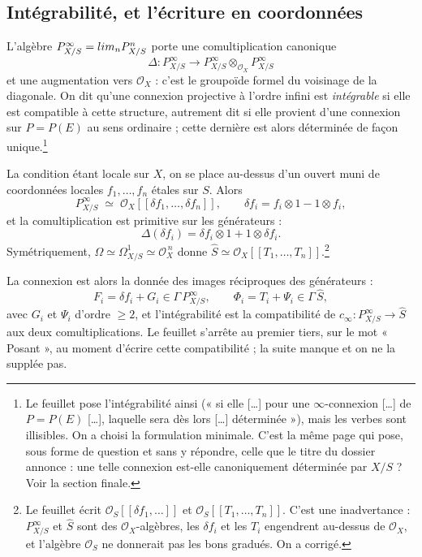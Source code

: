 \documentclass[11pt,a4paper]{article}
\begin{document}
\subsection*{Intégrabilité, et l'écriture en coordonnées}

L'algèbre $P^\infty_{X/S} = \varprojlim_n P^n_{X/S}$ porte une
comultiplication canonique
\[
  \Delta : P^\infty_{X/S} \longrightarrow
  P^\infty_{X/S} \otimes_{\mathcal{O}_X} P^\infty_{X/S}
\]
et une augmentation vers $\mathcal{O}_X$ : c'est le groupoïde formel du
voisinage de la diagonale. On dit qu'une connexion projective à l'ordre
infini est \emph{intégrable} si elle est compatible à cette structure,
autrement dit si elle provient d'une connexion sur $P = P(E)$ au sens
ordinaire ; cette dernière est alors déterminée de façon
unique.\footnote{Le feuillet pose l'intégrabilité ainsi (« si elle
[\ldots] pour une $\infty$-connexion [\ldots] de $P = P(E)$ [\ldots],
laquelle sera dès lors [\ldots] déterminée »), mais les verbes sont
illisibles. On a choisi la formulation
minimale. C'est la même page qui pose, sous forme de question et sans y
répondre, celle que le titre du dossier annonce : une telle connexion est-elle
canoniquement déterminée par $X/S$ ? Voir la section finale.}

La condition étant locale sur $X$, on se place au-dessus d'un ouvert muni de
coordonnées locales $f_1, \ldots, f_n$ étales sur $S$. Alors
\[
  P^\infty_{X/S} \;\simeq\;
  \mathcal{O}_X[[\delta f_1, \ldots, \delta f_n]],
  \qquad \delta f_i = f_i \otimes 1 - 1 \otimes f_i,
\]
et la comultiplication est primitive sur les générateurs :
\[
  \Delta(\delta f_i) = \delta f_i \otimes 1 + 1 \otimes \delta f_i .
\]
Symétriquement, $\Omega \simeq \Omega^1_{X/S} \simeq \mathcal{O}_X^{\,n}$
donne $\widehat{S} \simeq \mathcal{O}_X[[T_1, \ldots, T_n]]$.\footnote{Le
feuillet écrit $\mathcal{O}_S[[\delta f_1, \ldots]]$ et
$\mathcal{O}_S[[T_1, \ldots, T_n]]$. C'est une inadvertance : $P^\infty_{X/S}$
et $\widehat{S}$ sont des $\mathcal{O}_X$-algèbres, les $\delta f_i$ et les
$T_i$ engendrent au-dessus de $\mathcal{O}_X$, et l'algèbre $\mathcal{O}_S$ ne
donnerait pas les bons gradués. On a corrigé.}

La connexion est alors la donnée des images réciproques des générateurs :
\[
  F_i = \delta f_i + G_i \in \Gamma\, P^\infty_{X/S},
  \qquad \Phi_i = T_i + \Psi_i \in \Gamma\, \widehat{S},
\]
avec $G_i$ et $\Psi_i$ d'ordre $\geqslant 2$, et l'intégrabilité est la
compatibilité de $c_\infty : P^\infty_{X/S} \to \widehat{S}$ aux deux
comultiplications. Le feuillet s'arrête au premier tiers, sur le mot
« Posant », au moment d'écrire cette compatibilité ; la suite manque et
on ne la supplée pas.
\end{document}

